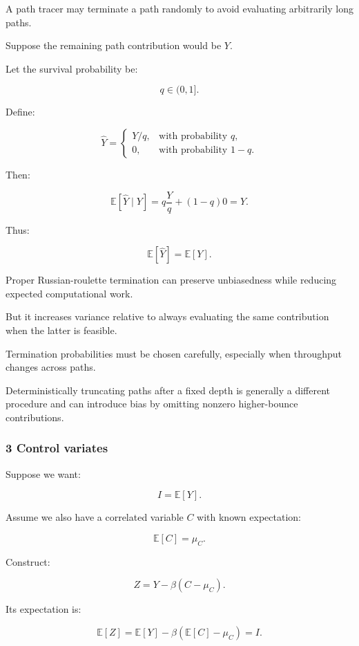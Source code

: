 \hypertarget{02-foundations-ii-ch031-russian-roulette}{}

A path tracer may terminate a path randomly to avoid evaluating arbitrarily long paths.

Suppose the remaining path contribution would be \(Y\).

Let the survival probability be:

\[
 q\in(0,1].
\]

Define:

\[
 \widehat Y= \begin{cases} Y/q,&\text{with probability }q,\\ 0,&\text{with probability }1-q. \end{cases}
\]

Then:

\[
 \mathbb E[\widehat Y\mid Y] = q\frac Yq+(1-q)0 =Y.
\]

Thus:

\[
 \boxed{ \mathbb E[\widehat Y]=\mathbb E[Y] }.
\]

Proper Russian-roulette termination can preserve unbiasedness while reducing expected computational work.

But it increases variance relative to always evaluating the same contribution when the latter is feasible.

Termination probabilities must be chosen carefully, especially when throughput changes across paths.

Deterministically truncating paths after a fixed depth is generally a different procedure and can introduce bias by omitting nonzero higher-bounce contributions.

\subsubsection{3 Control variates}\label{02-foundations-ii-ch031-control-variates}

\hypertarget{02-foundations-ii-ch031-control-variates}{}

Suppose we want:

\[
 I=\mathbb E[Y].
\]

Assume we also have a correlated variable \(C\) with known expectation:

\[
 \mathbb E[C]=\mu_C.
\]

Construct:

\[
 \boxed{ Z=Y-\beta(C-\mu_C) }.
\]

Its expectation is:

\[
 \mathbb E[Z] = \mathbb E[Y]-\beta(\mathbb E[C]-\mu_C) =I.
\]

